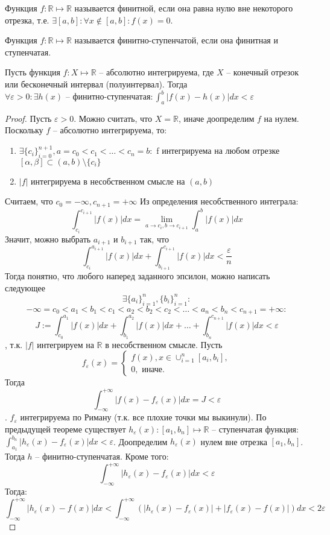 \documentclass[document.tex]{subfiles}
\begin{document}
\begin{definition}
Функция $f: \mathbb{R} \mapsto \mathbb{R}$ называется финитной, если она равна нулю вне некоторого отрезка, т.е. $\exists [a, b] : \forall x \not \in [a, b] : f(x) = 0$.
\end{definition}

\begin{definition}
Функция $f : \mathbb{R} \mapsto \mathbb{R}$ называется финитно-ступенчатой, если она финитная и ступенчатая.
\end{definition}

\begin{theorem}
    Пусть функция $f : X \mapsto \mathbb{R}$ -- абсолютно интегрируема, где $X$ -- конечный отрезок или
    бесконечный интервал (полуинтервал). Тогда $\forall \varepsilon > 0: \exists h(x)\text{ -- финитно-ступенчатая} : \int_a^b|f(x)-h(x)|dx < \varepsilon$
\end{theorem}
\begin{proof}
Пусть $\varepsilon > 0$.
Можно считать, что $X = \mathbb{R}$, иначе доопределим $f$ на нулем.
Поскольку $f$ -- абсолютно интегрируема, то:

\begin{enumerate}
    \item $\exists \{c_i\}_{i=0}^{n+1}, a = c_0 < c_1 < \ldots < c_n = b:$ f интегрируема на любом отрезке $[\alpha, \beta] \subset (a, b) \setminus \{c_i\}$
\item $|f|$ интегрируема в несобственном смысле на $(a, b)$
\end{enumerate}
Считаем, что $c_0 = -\infty, c_{n+1} = +\infty$
Из определения несобственного интеграла: 
\[
    \int_{c_i}^{c_{i+1}} |f(x)| dx = \lim_{a \rightarrow c_i, b \rightarrow c_{i+1}} \int_{a}^{b} |f(x)|dx
\]
Значит, можно выбрать $a_{i+1}$ и $b_{i+1}$ так, что
\[
    \int_{c_i}^{a_{i+1}} |f(x)|dx + \int_{b_{i+1}}^{c_{i+1}} |f(x)|dx < \frac{\varepsilon}{n}
\]
Тогда понятно, что любого наперед заданного эпсилон, можно написать следующее
$$\exists \{a_i\}_{i=1}^n, \{b_i\}_{i=1}^n:$$
\[-\infty = c_0 <  a_1 < b_1 < c_1 < a_2 < b_2 < c_2 < \ldots < a_n <
b_n < c_{n+1} = +\infty:
\]
$$J := \int_{c_0}^{a_1}|f(x)|dx + \int_{b_1}^{a_2}|f(x)|dx + \ldots + \int_{b_n}^{c_{n+1}}|f(x)|dx < \varepsilon$$, т.к. $|f|$ интегрируем на $\mathbb{R}$ в несобственном смысле. Пусть
$$f_{\varepsilon}(x) = \begin{cases}
    f(x), x \in \cup_{i = 1}^n [a_i, b_i], \\
    0, \text{ иначе}.
\end{cases}$$
Тогда $$\int_{-\infty}^{+\infty}|f(x) - f_{\varepsilon}(x)|dx = J < \varepsilon$$.
$f_{\varepsilon}$ интегрируема по Риману (т.к. все плохие точки мы выкинули). По предыдущей теореме существует $h_{\varepsilon}(x):[a_1, b_n] \mapsto \mathbb{R}$ -- ступенчатая функция: $\int_{a_1}^{b_n}|h_{\varepsilon}(x) - f_{\varepsilon}(x)|dx < \varepsilon$. Доопределим $h_{\varepsilon}(x)$ нулем вне отрезка $[a_1, b_n]$. Тогда $h$ -- финитно-ступенчатая. Кроме того:
$$\int_{-\infty}^{+\infty}|h_{\varepsilon}(x) - f_{\varepsilon}(x)|dx < \varepsilon$$
Тогда:
$$\int_{-\infty}^{+\infty}|h_{\varepsilon}(x) - f(x)|dx < \int_{-\infty}^{+\infty}(|h_{\varepsilon}(x) - f_{\varepsilon}(x)| + |f_{\varepsilon}(x) - f(x)|)dx < 2\varepsilon$$
\end{proof}
\end{document}
